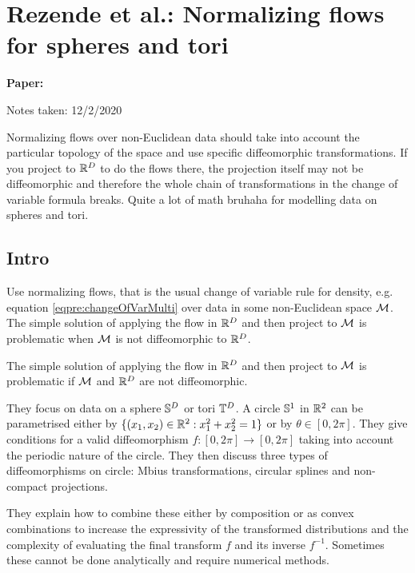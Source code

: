 \clearpage

\section{Rezende et al.: Normalizing flows for spheres and tori}

\begin{notebox}
\textbf{Paper: } 

\hfill Notes taken: 12/2/2020 
\end{notebox}

\begin{notebox}
\tldr Normalizing flows over non-Euclidean data should take into account the particular topology of the space and use specific diffeomorphic transformations. If you project to $\mathbb{R}^D$ to do the flows there, the projection itself may not be diffeomorphic and therefore the whole chain of transformations in the change of variable formula breaks. Quite a lot of math bruhaha for modelling data on spheres and tori.
\end{notebox}

\subsection{Intro}

Use normalizing flows, that is the usual change of variable rule for density, e.g. equation \eqref{eqpre:changeOfVarMulti} over data in some non-Euclidean space $\mathcal{M}$.
The simple solution of applying the flow in $\mathbb{R}^D$ and then project to $\mathcal{M}$ is problematic when $\mathcal{M}$ is not diffeomorphic to $\mathbb{R}^D$.

The simple solution of applying the flow in $\mathbb{R}^D$ and then project to $\mathcal{M}$ is problematic if $\mathcal{M}$ and $\mathbb{R}^D$ are not diffeomorphic.

They focus on data on a sphere $\mathbb{S}^D$ or tori $\mathbb{T}^D$. A circle $\mathbb{S}^1$ in $\mathbb{R}^2$ can be parametrised either by $\{(x_1, x_2) \in \mathbb{R}^2 : x_1^2 + x_2^2 = 1\}$ or by $\theta \in [0, 2\pi]$.
They give conditions for a valid diffeomorphism $f : [0, 2\pi] \to [0, 2\pi]$ taking into account the periodic nature of the circle.
They then discuss three types of diffeomorphisms on circle: Mbius transformations, circular splines and non-compact projections.

They explain how to combine these either by composition or as convex combinations to increase the expressivity of the transformed distributions and the complexity of evaluating the final transform $f$ and its inverse $f^{-1}$. Sometimes these cannot be done analytically and require numerical methods.

